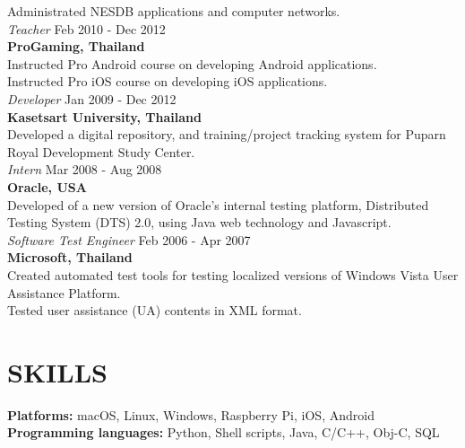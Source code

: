 \documentclass[margin, 10pt]{res} %
\begin{document}
\begin{resume}
Administrated NESDB applications and computer networks. \vspace{3mm} \\
{\sl Teacher} \hfill Feb 2010 - Dec 2012 \\
\textbf{ProGaming, Thailand}\\
Instructed Pro Android course on developing Android applications.\\
Instructed Pro iOS course on developing iOS applications. \vspace{3mm} \\
{\sl Developer} \hfill Jan 2009 - Dec 2012 \\
\textbf{Kasetsart University, Thailand}\\
Developed a digital repository, and training/project tracking system for Puparn Royal Development Study Center. \vspace{3mm} \\
{\sl Intern} \hfill Mar 2008 - Aug 2008 \\
\textbf{Oracle, USA}\\
Developed of a new version of Oracle's internal testing platform, Distributed  
Testing System (DTS) 2.0, using Java web technology and Javascript. \vspace{3mm} \\
{\sl Software Test Engineer} \hfill Feb 2006 - Apr 2007\\
\textbf{Microsoft, Thailand}\\
Created automated test tools for testing localized versions of Windows Vista User Assistance Platform.\\
Tested user assistance (UA) contents in XML format.


\section{SKILLS}
\textbf{Platforms: } macOS, Linux, Windows, Raspberry Pi, iOS, Android \\
\textbf{Programming languages: } Python, Shell scripts, Java, C/C++, Obj-C, SQL



\end{resume}
\end{document}
